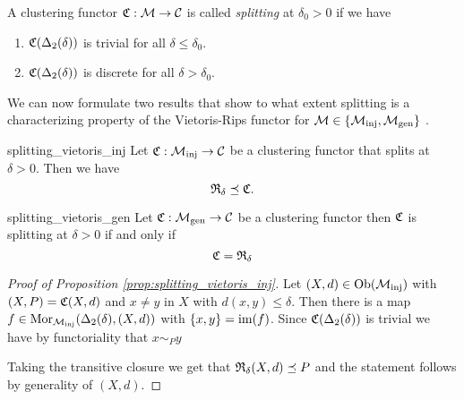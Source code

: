 \begin{definition}{}{}
    A clustering functor $\mathfrak{C}: \mathcal{M} \to \mathcal{C}$ is called \emph{splitting} at $\delta_0 > 0$ if we have
    \begin{enumerate}
        \item $\mathfrak{C}(\Delta_2(\delta))$ is trivial for all $\delta \leq \delta_0$.
        \item $\mathfrak{C}(\Delta_2(\delta))$ is discrete for all $\delta > \delta_0$.
    \end{enumerate}
\end{definition}

We can now formulate two results that show to what extent splitting is a characterizing property of the Vietoris-Rips functor for $\mathcal{M} \in \{{\mathcal{M}_\mathrm{inj}}, {\mathcal{M}_\mathrm{gen}}\}$ \cite[Thm.~6.4]{Carlsson2010}.

\begin{proposition}{}{splitting_vietoris_inj}
    Let $\mathfrak{C}: {\mathcal{M}_\mathrm{inj}} \to \mathcal{C}$ be a clustering functor that splits at $\delta > 0$. Then we have 
    $$
    \mathfrak{R}_\delta \preceq \mathfrak{C}.
    $$
\end{proposition}


\begin{proposition}{}{splitting_vietoris_gen}
    Let $\mathfrak{C}: {\mathcal{M}_\mathrm{gen}} \to \mathcal{C}$ be a clustering functor then $\mathfrak{C}$ is splitting at $\delta > 0$ if and only if 
    $$
    \mathfrak{C} = \mathfrak{R}_\delta
    $$
\end{proposition}

\begin{proof}[Proof of Proposition \ref{prop:splitting_vietoris_inj}]
    Let $(X,d) \in \mathrm {Ob}({\mathcal{M}_\mathrm{inj}})$ with $(X,P) = \mathfrak{C}(X,d)$ and $x \neq y$ in $X$ with $d(x,y) \leq \delta$.
    Then there is a map $f \in \mathrm {Mor}_{\mathcal{M}_\mathrm{inj}}(\Delta_2(\delta), (X,d))$ with $\{x,y\} = \operatorname*{im}(f)$.
    Since $\mathfrak{C}(\Delta_2(\delta))$ is trivial we have by functoriality that $x \sim_P y$

    Taking the transitive closure we get that $\mathfrak{R}_\delta(X,d) \preceq P$ and the statement follows by generality of $(X,d)$.
\end{proof}


